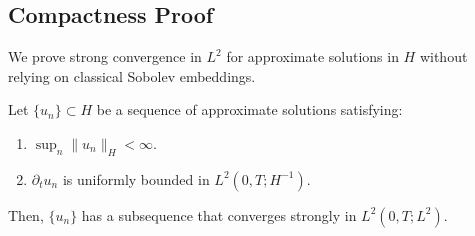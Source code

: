 \subsection{Compactness Proof}
We prove strong convergence in $L^2$ for approximate solutions in $H$ without relying on classical Sobolev embeddings.

\begin{theorem}[Compactness in $H$]
Let $\{u_n\} \subset H$ be a sequence of approximate solutions satisfying:
\begin{enumerate}
    \item $\sup_n \|u_n\|_H < \infty$.
    \item $\partial_t u_n$ is uniformly bounded in $L^2(0, T; H^{-1})$.
\end{enumerate}
Then, $\{u_n\}$ has a subsequence that converges strongly in $L^2(0, T; L^2)$.
\end{theorem}

